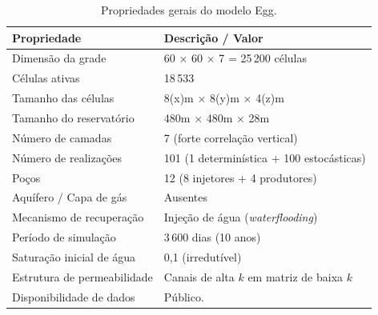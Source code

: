 
\begin{table}[H]
\centering
\caption{Propriedades gerais do modelo Egg.}
\label{tab:2.1}
\begin{tabular}{ll}
\hline
\textbf{Propriedade} & \textbf{Descrição / Valor} \\ \hline
Dimensão da grade & 60 × 60 × 7 = 25\,200 células \\
Células ativas & 18\,533 \\
Tamanho das células & 8(x)m × 8(y)m × 4(z)m \\
Tamanho do reservatório & 480m × 480m × 28m \\
Número de camadas & 7 (forte correlação vertical) \\
Número de realizações & 101 (1 determinística + 100 estocásticas) \\
Poços & 12 (8 injetores + 4 produtores) \\
Aquífero / Capa de gás & Ausentes \\
Mecanismo de recuperação & Injeção de água (\textit{waterflooding}) \\
Período de simulação & 3\,600 dias (10 anos) \\
Saturação inicial de água & 0,1 (irredutível) \\
Estrutura de permeabilidade & Canais de alta $k$ em matriz de baixa $k$ \\
Disponibilidade de dados & Público. \\ \hline
\end{tabular}
\end{table}

